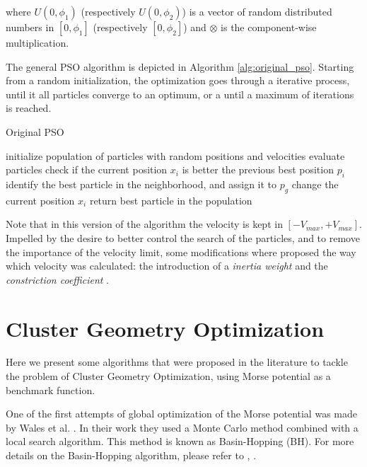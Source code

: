 						\noindent where $U(0, \phi_1)$ (respectively $U(0, \phi_2)$) is a vector of random distributed numbers in $[0, \phi_1]$ (respectively $[0, \phi_2]$)  and $\otimes$ is the component-wise multiplication.
					
					
					
					The general PSO algorithm is depicted in Algorithm \ref{alg:original_pso}. Starting from a random initialization, the optimization goes through a iterative process, until it all particles converge to an optimum, or a until a maximum of iterations is reached. 
					
					\begin{algorithm}[h]
						\caption{Original PSO}
						\label{alg:original_pso}
						\begin{algorithmic}
						\STATE initialize population of particles with random positions and velocities
							\STATE evaluate particles
							\STATE check if the current position $x_i$ is better the previous best position $p_i$ 
							\STATE identify the best particle in the neighborhood, and assign it to $p_g$
							\STATE change the current position $x_i$%
						\ENDWHILE
						\STATE return best particle in the population
						\end{algorithmic}
					\end{algorithm}


					Note that in this version of the algorithm the velocity is kept in $[-V_{max}, +V_{max}]$. Impelled by the desire to better control the search of the particles, and to remove the importance of the velocity limit, some modifications where proposed the way which velocity was calculated: the introduction of a \emph{inertia weight} \cite{shi98} and the \emph{constriction coefficient} \cite{clerc02}.
					
		
			
	\section{Cluster Geometry Optimization}
		\label{subsec:cgo}
		Here we present some algorithms that were proposed in the literature to tackle the problem of Cluster Geometry Optimization, using Morse potential as a benchmark function.

		One of the first attempts of global optimization of the Morse potential was made by Wales et al. \cite{wales98}. In their work they used a Monte Carlo method combined with a local search algorithm. This method is known as Basin-Hopping (BH). For more details on the Basin-Hopping algorithm, please refer to \cite{wales98}, \cite{li87}.
		
